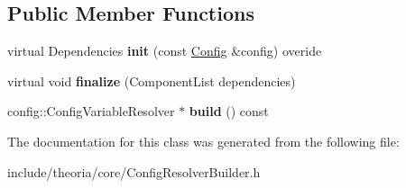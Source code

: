 \subsection*{Public Member Functions}
\begin{DoxyCompactItemize}
\item 
\mbox{\label{classConfigResolverBuilder_a63ae6487bfd38e5a13de3a369d1509ec}} 
virtual Dependencies {\bfseries init} (const \hyperlink{classtheoria_1_1config_1_1Config}{Config} \&config) overide
\item 
\mbox{\label{classConfigResolverBuilder_a591ec176049f29c3a51fbad2501f1ab0}} 
virtual void {\bfseries finalize} (Component\+List dependencies)
\item 
\mbox{\label{classConfigResolverBuilder_aaab8623502528a6de4129b1016f02224}} 
config\+::\+Config\+Variable\+Resolver $\ast$ {\bfseries build} () const
\end{DoxyCompactItemize}


The documentation for this class was generated from the following file\+:\begin{DoxyCompactItemize}
\item 
include/theoria/core/Config\+Resolver\+Builder.\+h\end{DoxyCompactItemize}
